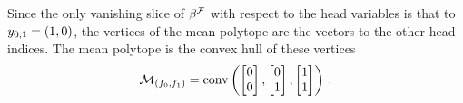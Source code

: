 \begin{example}
    Since the only vanishing slice of $\beta^{\mathcal{F}}$ with respect to the head variables is that to $y_{0,1} = (1,0)$, the vertices of the mean polytope are the vectors to the other head indices.
    The mean polytope is the convex hull of these vertices
    \begin{align*}
        \mathcal{M}_{(f_{0},f_{1})} =
        \mathrm{conv}\left(\begin{bmatrix}
                        0 \\ 0
        \end{bmatrix},
            \begin{bmatrix}
                0 \\ 1
            \end{bmatrix},
            \begin{bmatrix}
                1 \\ 1
            \end{bmatrix}\right) \, .
    \end{align*}


\end{example}
